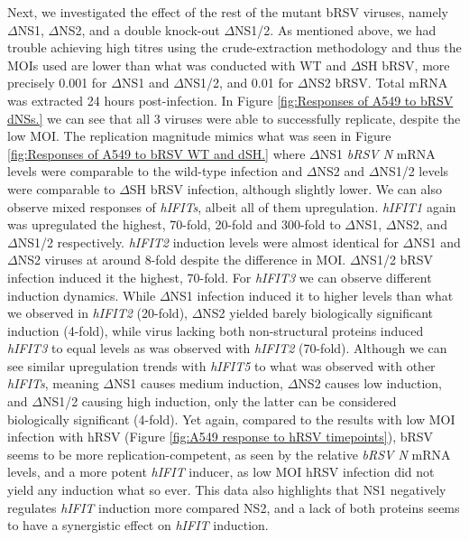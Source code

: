 Next, we investigated the effect of the rest of the mutant bRSV viruses, namely \(\Delta\)NS1, \(\Delta\)NS2, and a double knock-out \(\Delta\)NS1/2. As mentioned above, we had trouble achieving high titres using the crude-extraction methodology and thus the MOIs used are lower than what was conducted with WT and \(\Delta\)SH bRSV, more precisely 0.001 for \(\Delta\)NS1 and \(\Delta\)NS1/2, and 0.01 for \(\Delta\)NS2 bRSV. Total mRNA was extracted 24 hours post-infection. In Figure \ref{fig:Responses of A549 to bRSV dNSs.} we can see that all 3 viruses were able to successfully replicate, despite the low MOI. The replication magnitude mimics what was seen in Figure \ref{fig:Responses of A549 to bRSV WT and dSH.} where \(\Delta\)NS1 \textit{bRSV N} mRNA levels were comparable to the wild-type infection and \(\Delta\)NS2 and \(\Delta\)NS1/2 levels were comparable to \(\Delta\)SH bRSV infection, although slightly lower. We can also observe mixed responses of \textit{hIFITs}, albeit all of them upregulation. \textit{hIFIT1} again was upregulated the highest, 70-fold, 20-fold and 300-fold to \(\Delta\)NS1, \(\Delta\)NS2, and \(\Delta\)NS1/2 respectively. \textit{hIFIT2} induction levels were almost identical for \(\Delta\)NS1 and \(\Delta\)NS2 viruses at around 8-fold despite the difference in MOI. \(\Delta\)NS1/2 bRSV infection induced it the highest, 70-fold. For \textit{hIFIT3} we can observe different induction dynamics. While \(\Delta\)NS1 infection induced it to higher levels than what we observed in \textit{hIFIT2} (20-fold), \(\Delta\)NS2 yielded barely biologically significant induction (4-fold), while virus lacking both non-structural proteins induced \textit{hIFIT3} to equal levels as was observed with \textit{hIFIT2} (70-fold). Although we can see similar upregulation trends with \textit{hIFIT5} to what was observed with other \textit{hIFITs}, meaning \(\Delta\)NS1 causes medium induction, \(\Delta\)NS2 causes low induction, and \(\Delta\)NS1/2 causing high induction, only the latter can be considered biologically significant (4-fold). Yet again, compared to the results with low MOI infection with hRSV (Figure \ref{fig:A549 response to hRSV timepoints}), bRSV seems to be more replication-competent, as seen by the relative \textit{bRSV N} mRNA levels, and a more potent \textit{hIFIT} inducer, as low MOI hRSV infection did not yield any induction what so ever. This data also highlights that NS1 negatively regulates \textit{hIFIT} induction more compared NS2, and a lack of both proteins seems to have a synergistic effect on \textit{hIFIT} induction.


